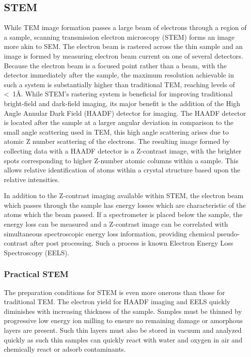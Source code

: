 \subsection{STEM}
While TEM image formation passes a large beam of electrons through a region of a sample, scanning transmission electron microscopy (STEM) forms an image more akin to SEM\@.
The electron beam is rastered across the thin sample and an image is formed by measuring electron beam current on one of several detectors.
Because the electron beam is a focused point rather than a beam, with the detector immediately after the sample, the maximum resolution achievable in such a system is substantially higher than traditional TEM, reaching levels of <~1\AA{}.
While STEM's rastering system is beneficial for improving traditional bright-field and dark-field imaging, its major benefit is the addition of the High Angle Annular Dark Field (HAADF) detector for imaging.
The HAADF detector is located after the sample at a larger angular deviation in comparison to the small angle scattering used in TEM, this high angle scattering arises due to atomic Z number scattering of the electrons.
The resulting image formed by collecting data with a HAADF detector is a Z-contrast image, with the brighter spots corresponding to higher Z-number atomic columns within a sample.
This allows relative identification of atoms within a crystal structure based upon the relative intensities.

In addition to the Z-contrast imaging available within STEM, the electron beam which passes through the sample has energy losses which are characteristic of the atoms which the beam passed.
If a spectrometer is placed below the sample, the energy loss can be measured and a Z-contrast image can be correlated with simultaneous spectroscopic energy loss information, providing chemical pseudo-contrast after post processing.
Such a process is known Electron Energy Loss Spectroscopy (EELS).

\subsubsection{Practical STEM} 
The preparation conditions for STEM is even more onerous than those for traditional TEM\@.
The electron yield for HAADF imaging and EELS quickly diminishes with increasing thickness of the sample.
Samples must be thinned by progressive low energy ion milling to ensure no remaining damage or amorphous layers are present.
Such thin layers must also be stored in vacuum and analyzed quickly as such thin samples can quickly react with water and oxygen in air and chemically react or adsorb contaminants.

